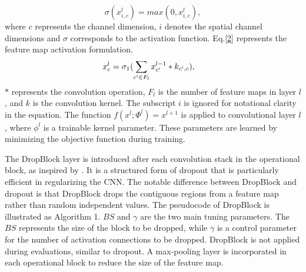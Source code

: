 \documentclass[journal]{IEEEtran}
\begin{document}
\begin{equation}
\sigma(x^l_{i,c})= max(0,x^l_{i,c}),
\label{1}
\end{equation}
where $c$ represents the channel dimension, $i$ denotes the spatial channel dimensions and $\sigma$ corresponds to the activation function. Eq.\ref{2} represents the feature map activation formulation. \\
\begin{equation}
\vspace{0.1cm}
\begin{aligned}
& x^l_{c}=\sigma_1( \sum_{{c'}\in F_l} x_{c'}^{l-1}*k_{c',c}),
\label{2}
\end{aligned}
\end{equation}
$*$ represents the convolution operation, $F_l$ is the number of feature maps in layer $l$, and $k$ is the convolution kernel. The subscript $i$ is ignored for notational clarity in the equation. The function $f(x^l;\Phi ^l)=x^{l+1}$ is applied to convolutional layer $l$, where $\phi ^l$ is a trainable kernel parameter. These parameters are learned by minimizing the objective function during training.
\par
The DropBlock layer is introduced after each convolution stack in the operational block, as inspired by \cite{DB}. It is a structured form of dropout that is particularly efficient in regularizing the CNN. The notable difference between DropBlock and dropout is that DropBlock drops the contiguous regions from a feature map rather than random independent values. The pseudocode of DropBlock is illustrated as Algorithm 1. $BS$ and $\gamma$ are the two main tuning parameters. The $BS$ represents the size of the block to be dropped, while $\gamma$ is a control parameter for the number of activation connections to be dropped. DropBlock is not applied during evaluations, similar to dropout. A max-pooling layer is incorporated in each operational block to reduce the size of the feature map.
\end{document}
